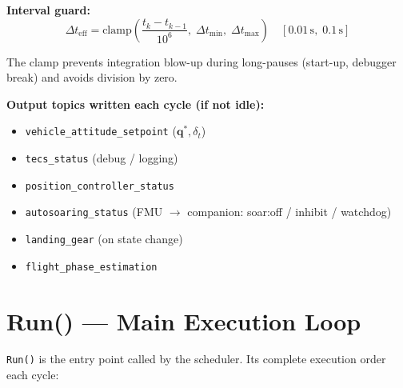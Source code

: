 \documentclass[12pt,a4paper]{article}
\begin{document}
\textbf{Interval guard:}
\begin{equation}
  \Delta t_{\text{eff}} = \text{clamp}\!\left(
    \frac{t_k - t_{k-1}}{10^6},\;
    \Delta t_{\min},\;\Delta t_{\max}
  \right)
  \quad [0.01\,\text{s},\;0.1\,\text{s}]
\end{equation}

The clamp prevents integration blow-up during long-pauses (start-up,
debugger break) and avoids division by zero.

\textbf{Output topics written each cycle (if not idle):}
\begin{itemize}
  \item \texttt{vehicle\_attitude\_setpoint} ($\mathbf{q}^*, \delta_t$)
  \item \texttt{tecs\_status} (debug / logging)
  \item \texttt{position\_controller\_status}
  \item \texttt{autosoaring\_status} (FMU $\rightarrow$ companion: soar:off / inhibit / watchdog)
  \item \texttt{landing\_gear} (on state change)
  \item \texttt{flight\_phase\_estimation}
\end{itemize}

\section{Run() --- Main Execution Loop}

\texttt{Run()} is the entry point called by the scheduler. Its complete
execution order each cycle:
\end{document}
